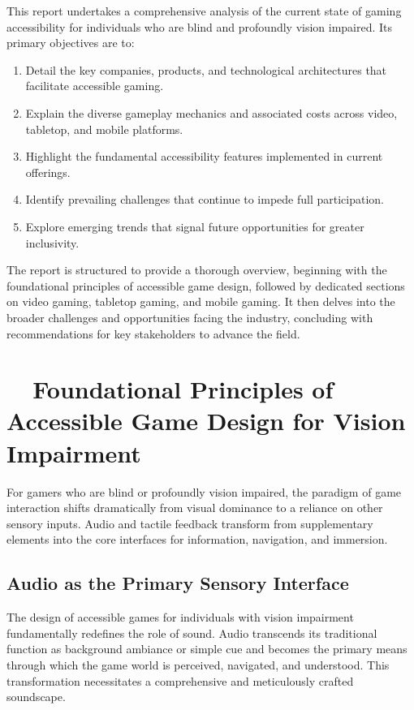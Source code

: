 This report undertakes a comprehensive analysis of the current state of gaming accessibility for individuals who are blind and profoundly vision impaired. Its primary objectives are to:
\begin{enumerate}
    \item Detail the key companies, products, and technological architectures that facilitate accessible gaming.
    \item Explain the diverse gameplay mechanics and associated costs across video, tabletop, and mobile platforms.
    \item Highlight the fundamental accessibility features implemented in current offerings.
    \item Identify prevailing challenges that continue to impede full participation.
    \item Explore emerging trends that signal future opportunities for greater inclusivity.
\end{enumerate}
The report is structured to provide a thorough overview, beginning with the foundational principles of accessible game design, followed by dedicated sections on video gaming, tabletop gaming, and mobile gaming. It then delves into the broader challenges and opportunities facing the industry, concluding with recommendations for key stakeholders to advance the field.

\section{~~Foundational Principles of Accessible Game Design for Vision Impairment}

For gamers who are blind or profoundly vision impaired, the paradigm of game interaction shifts dramatically from visual dominance to a reliance on other sensory inputs. Audio and tactile feedback transform from supplementary elements into the core interfaces for information, navigation, and immersion.

\subsection{Audio as the Primary Sensory Interface}

The design of accessible games for individuals with vision impairment fundamentally redefines the role of sound. Audio transcends its traditional function as background ambiance or simple cue and becomes the primary means through which the game world is perceived, navigated, and understood. This transformation necessitates a comprehensive and meticulously crafted soundscape.

